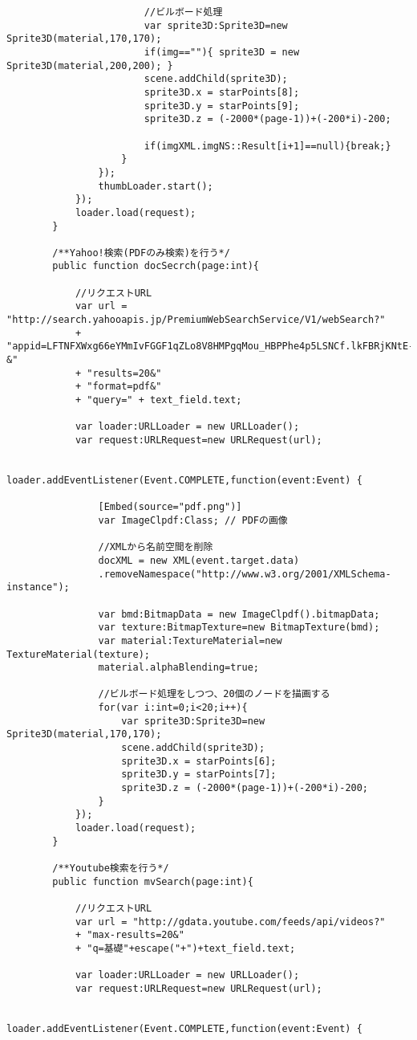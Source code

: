 {\begin{verbatim}
						//ビルボード処理
						var sprite3D:Sprite3D=new Sprite3D(material,170,170);
						if(img==""){ sprite3D = new Sprite3D(material,200,200); }
						scene.addChild(sprite3D);
						sprite3D.x = starPoints[8];
						sprite3D.y = starPoints[9];
						sprite3D.z = (-2000*(page-1))+(-200*i)-200;
						
						if(imgXML.imgNS::Result[i+1]==null){break;}
					}
				});
				thumbLoader.start();
			});
			loader.load(request);
		}
		
		/**Yahoo!検索(PDFのみ検索)を行う*/
		public function docSecrch(page:int){
			
			//リクエストURL
			var url = "http://search.yahooapis.jp/PremiumWebSearchService/V1/webSearch?"
			+ "appid=LFTNFXWxg66eYMmIvFGGF1qZLo8V8HMPgqMou_HBPPhe4p5LSNCf.lkFBRjKNtE-&"
			+ "results=20&"
			+ "format=pdf&"
			+ "query=" + text_field.text;
			
			var loader:URLLoader = new URLLoader();
			var request:URLRequest=new URLRequest(url);
			
			loader.addEventListener(Event.COMPLETE,function(event:Event) {
				
				[Embed(source="pdf.png")]
				var ImageClpdf:Class; // PDFの画像
									
				//XMLから名前空間を削除
				docXML = new XML(event.target.data)
				.removeNamespace("http://www.w3.org/2001/XMLSchema-instance");
					
				var bmd:BitmapData = new ImageClpdf().bitmapData;
				var texture:BitmapTexture=new BitmapTexture(bmd);
				var material:TextureMaterial=new TextureMaterial(texture);
				material.alphaBlending=true;
				
				//ビルボード処理をしつつ、20個のノードを描画する
				for(var i:int=0;i<20;i++){
					var sprite3D:Sprite3D=new Sprite3D(material,170,170);
					scene.addChild(sprite3D);
					sprite3D.x = starPoints[6];
					sprite3D.y = starPoints[7];
					sprite3D.z = (-2000*(page-1))+(-200*i)-200;
				}
			});
			loader.load(request);
		}
		
		/**Youtube検索を行う*/
		public function mvSearch(page:int){
			
			//リクエストURL
			var url = "http://gdata.youtube.com/feeds/api/videos?"
			+ "max-results=20&"
			+ "q=基礎"+escape("+")+text_field.text;
			
			var loader:URLLoader = new URLLoader();
			var request:URLRequest=new URLRequest(url);
			
			loader.addEventListener(Event.COMPLETE,function(event:Event) {
									

\end{verbatim}}
